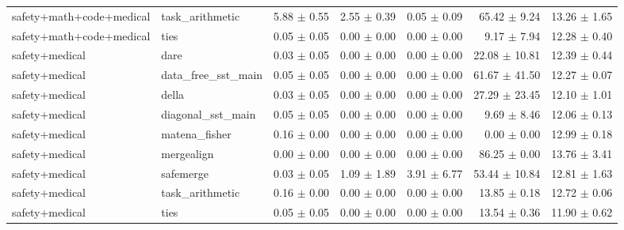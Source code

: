 \documentclass{article}
\begin{document}
\begin{table}[H]
{\begin{tabular}{llrrrrr}
safety+math+code+medical & task\_arithmetic & 5.88 $\pm$ 0.55 & 2.55 $\pm$ 0.39 & 0.05 $\pm$ 0.09 & 65.42 $\pm$ 9.24 & 13.26 $\pm$ 1.65 \\
safety+math+code+medical & ties & 0.05 $\pm$ 0.05 & 0.00 $\pm$ 0.00 & 0.00 $\pm$ 0.00 & 9.17 $\pm$ 7.94 & 12.28 $\pm$ 0.40 \\
safety+medical & dare & 0.03 $\pm$ 0.05 & 0.00 $\pm$ 0.00 & 0.00 $\pm$ 0.00 & 22.08 $\pm$ 10.81 & 12.39 $\pm$ 0.44 \\
safety+medical & data\_free\_sst\_main & 0.05 $\pm$ 0.05 & 0.00 $\pm$ 0.00 & 0.00 $\pm$ 0.00 & 61.67 $\pm$ 41.50 & 12.27 $\pm$ 0.07 \\
safety+medical & della & 0.03 $\pm$ 0.05 & 0.00 $\pm$ 0.00 & 0.00 $\pm$ 0.00 & 27.29 $\pm$ 23.45 & 12.10 $\pm$ 1.01 \\
safety+medical & diagonal\_sst\_main & 0.05 $\pm$ 0.05 & 0.00 $\pm$ 0.00 & 0.00 $\pm$ 0.00 & 9.69 $\pm$ 8.46 & 12.06 $\pm$ 0.13 \\
safety+medical & matena\_fisher & 0.16 $\pm$ 0.00 & 0.00 $\pm$ 0.00 & 0.00 $\pm$ 0.00 & 0.00 $\pm$ 0.00 & 12.99 $\pm$ 0.18 \\
safety+medical & mergealign & 0.00 $\pm$ 0.00 & 0.00 $\pm$ 0.00 & 0.00 $\pm$ 0.00 & 86.25 $\pm$ 0.00 & 13.76 $\pm$ 3.41 \\
safety+medical & safemerge & 0.03 $\pm$ 0.05 & 1.09 $\pm$ 1.89 & 3.91 $\pm$ 6.77 & 53.44 $\pm$ 10.84 & 12.81 $\pm$ 1.63 \\
safety+medical & task\_arithmetic & 0.16 $\pm$ 0.00 & 0.00 $\pm$ 0.00 & 0.00 $\pm$ 0.00 & 13.85 $\pm$ 0.18 & 12.72 $\pm$ 0.06 \\
safety+medical & ties & 0.05 $\pm$ 0.05 & 0.00 $\pm$ 0.00 & 0.00 $\pm$ 0.00 & 13.54 $\pm$ 0.36 & 11.90 $\pm$ 0.62 \\
\bottomrule
\end{tabular}
}
\end{table}

\begin{table}[H]
\centering
\caption{崩壊分析: safety+math条件におけるSST-Merge(GSM8K対象)の詳細指標と偽の安全性}
\label{tab:evaluation_yobi_main_GSM8K}
\small
{}
\end{table}
\end{document}
